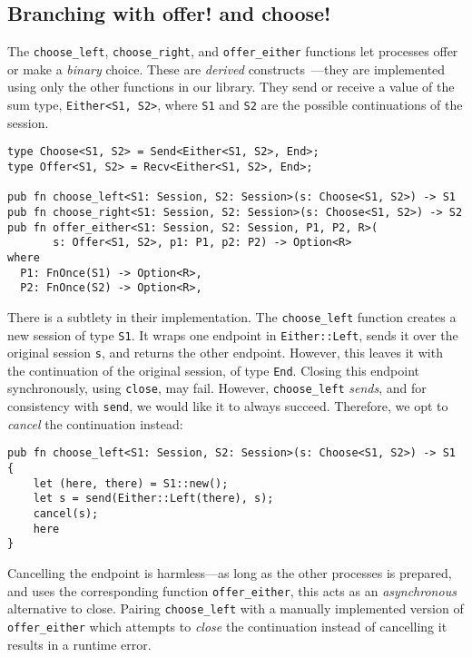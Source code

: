 \documentclass[copyright,creativecommons]{eptcs}
\begin{document}
\subsection{Branching with offer! and choose!}\label{sec:choice}
The \lstinline{choose_left}, \lstinline{choose_right}, and \lstinline{offer_either} functions let processes offer or make a \emph{binary} choice. These are \emph{derived} constructs~\cite{honda1993,dardha2017}---they are implemented using only the other functions in our library. They send or receive a value of the sum type, \lstinline{Either<S1, S2>}, where \lstinline{S1} and \lstinline{S2} are the possible continuations of the session.
\begin{lstlisting}
type Choose<S1, S2> = Send<Either<S1, S2>, End>;
type Offer<S1, S2> = Recv<Either<S1, S2>, End>;

pub fn choose_left<S1: Session, S2: Session>(s: Choose<S1, S2>) -> S1
pub fn choose_right<S1: Session, S2: Session>(s: Choose<S1, S2>) -> S2
pub fn offer_either<S1: Session, S2: Session, P1, P2, R>(
       s: Offer<S1, S2>, p1: P1, p2: P2) -> Option<R>
where
  P1: FnOnce(S1) -> Option<R>,
  P2: FnOnce(S2) -> Option<R>,
\end{lstlisting}
There is a subtlety in their implementation. The \lstinline{choose_left} function creates a new session of type \lstinline{S1}. It wraps one endpoint in \lstinline{Either::Left}, sends it over the original session \lstinline{s}, and returns the other endpoint. However, this leaves it with the continuation of the original session, of type \lstinline{End}. Closing this endpoint synchronously, using \lstinline{close}, may fail. However, \lstinline{choose_left} \emph{sends}, and for consistency with \lstinline{send}, we would like it to always succeed. Therefore, we opt to \emph{cancel} the continuation instead:
\begin{lstlisting}
pub fn choose_left<S1: Session, S2: Session>(s: Choose<S1, S2>) -> S1 {
    let (here, there) = S1::new();
    let s = send(Either::Left(there), s);
    cancel(s);
    here
} 
\end{lstlisting}
Cancelling the endpoint is harmless---as long as the other processes is prepared, and uses the corresponding function \lstinline{offer_either}, this acts as an \emph{asynchronous} alternative to close. Pairing \lstinline{choose_left} with a manually implemented version of \lstinline{offer_either} which attempts to \emph{close} the continuation instead of cancelling it results in a runtime error.
\end{document}
